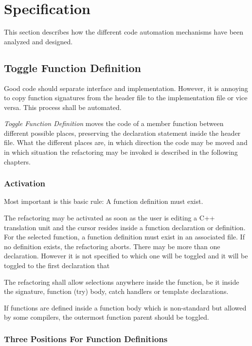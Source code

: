 \chapter{Specification}
\thispagestyle{fancy}

This section describes how the different code automation mechanisms have been
analyzed and designed.

\section{Toggle Function Definition}

Good code should separate interface and implementation. However, it is 
annoying to copy function signatures from the header file to the implementation 
file or vice versa. This process shall be automated.

\textit{Toggle Function Definition} moves the code of a member function between 
different possible places, preserving the declaration statement inside the 
header file. What the different places are, in which direction the code may be 
moved and in which situation the refactoring may be invoked is described in the 
following chapters.

\subsection{Activation}

Most important is this basic rule: A function definition must exist.

The refactoring may be activated as soon as the user is editing a C++
translation unit and the cursor resides inside a function declaration or
definition. For the selected function, a function definition must exist in an
associated file. If no definition exists, the refactoring aborts. There may be
more than one declaration. However it is not specified to which one will be
toggled and it will be toggled to the first declaration that

The refactoring shall allow selections anywhere inside the function, be it 
inside the signature, function (try) body, catch handlers or template 
declarations.


If functions are defined inside a function body which is non-standard but
allowed by some compilers, the outermost function parent should be toggled.
\cite{GCC}

\subsection{Three Positions For Function Definitions}

